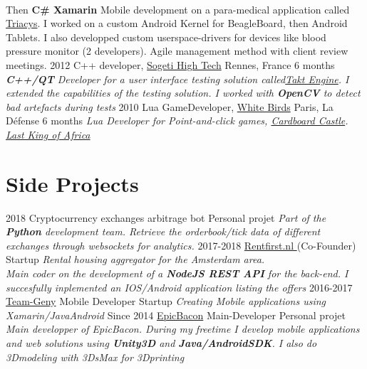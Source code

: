 \documentclass{emonides-cv}
\begin{document}
\begin{entrylist}
{{    \\Then \textbf{C\# Xamarin} Mobile development on a para-medical application called \href{http://www.triacys.com/}{Triacys}.
    I worked on a custom Android Kernel for BeagleBoard, then Android Tablets. I also developped custom userspace-drivers for devices like blood pressure monitor
    (2 developers). Agile management method with client review meetings. }}
  \entry
    {2012}
    {C++ developer, \href{https://www.acensi.fr/}{Sogeti High Tech} {\normalfont Rennes, France}}
    {6 months}
    {\emph{\textbf{C++/QT} Developer for a user interface testing solution called\href{https://www.eurocaution.net/}{Takt Engine}.
    I extended the capabilities of the testing solution. I worked with \textbf{OpenCV} to detect bad artefacts during tests }}
  \entry
    {2010}
    {Lua GameDeveloper, \href{https://www.giantbomb.com/white-birds-productions/3010-5637/}{White Birds} {\normalfont Paris, La Défense}}
    {6 months}
    {\emph{Lua Developer for Point-and-click games, \href{https://www.bigfishgames.com/games/6859/cardboard-castle/}{Cardboard Castle}. \href{https://www.wikiwand.com/fr/White_Birds_Productions}{Last King of Africa}}}
\end{entrylist}

\vspace{1.5cm}

\section{Side Projects}
\begin{entrylist}
  \entry
    {2018}
    {Cryptocurrency exchanges arbitrage bot {\normalfont }}
    {Personal projet}
    {\emph{Part of the \textbf{Python} development team. Retrieve the orderbook/tick data of different exchanges through websockets for analytics. }}
  \entry
    {2017-2018}
    {\href{https://www.Rentfirst.nl/}{Rentfirst.nl  } {\normalfont  (Co-Founder)}}
    {Startup}
    {\emph{Rental housing aggregator for the Amsterdam area. \\
    Main coder on the development of a \textbf{NodeJS REST API} for the back-end.
    I succesfully inplemented an IOS/Android application listing the offers}}
  \entry
    {2016-2017}
    {\href{http://www.teamgeny.com/}{Team-Geny} {\normalfont Mobile Developer}}
    {Startup}
    {\emph{Creating Mobile applications using Xamarin/JavaAndroid}}
  \entry
    {Since 2014}
    {\href{https://play.google.com/store/apps/developer?id=EpicBacon}{EpicBacon} {\normalfont Main-Developer}}
    {Personal projet}
    {\emph{Main developper of EpicBacon. During my freetime I develop mobile applications and web solutions using \textbf{Unity3D} and \textbf{Java/AndroidSDK}.
    I also do 3Dmodeling with 3DsMax for 3Dprinting  }}
\end{entrylist}
\end{document}
